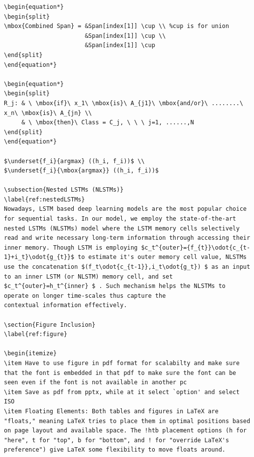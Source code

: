 \documentclass{article}
\begin{document}
\begin{lstlisting}
\begin{equation*}
\begin{split}
\mbox{Combined Span} = &Span[index[1]] \cup \\ %cup is for union
                       &Span[index[1]] \cup \\
                       &Span[index[1]] \cup
\end{split}
\end{equation*}

\begin{equation*}
\begin{split}
R_j: & \ \mbox{if}\ x_1\ \mbox{is}\ A_{j1}\ \mbox{and/or}\ ........\ x_n\ \mbox{is}\ A_{jn} \\
     & \ \mbox{then}\ Class = C_j, \ \ \ j=1, ......,N     
\end{split}
\end{equation*}

$\underset{f_i}{argmax} ((h_i, f_i))$ \\
$\underset{f_i}{\mbox{argmax}} ((h_i, f_i))$

\subsection{Nested LSTMs (NLSTMs)}
\label{ref:nestedLSTMs}
Nowadays, LSTM based deep learning models are the most popular choice for sequential tasks. In our model, we employ the state-of-the-art nested LSTMs (NLSTMs) model where the LSTM memory cells selectively read and write necessary long-term information through accessing their inner memory. Though LSTM is employing $c_t^{outer}={f_{t}}\odot{c_{t-1}+i_t}\odot{g_{t}}$ to estimate it's outer memory cell value, NLSTMs use the concatenation $(f_t\odot{c_{t-1}},i_t\odot{g_t}) $ as an input to an inner LSTM (or NLSTM) memory cell, and set $c_t^{outer}=h_t^{inner} $ . Such mechanism helps the NLSTMs to operate on longer time-scales thus capture the
contextual information effectively.

\section{Figure Inclusion}
\label{ref:figure}

\begin{itemize}
\item Have to use figure in pdf format for scalabilty and make sure that the font is embedded in that pdf to make sure the font can be seen even if the font is not available in another pc
\item Save as pdf from pptx, while at it select `option' and select ISO
\item Floating Elements: Both tables and figures in LaTeX are "floats," meaning LaTeX tries to place them in optimal positions based on page layout and available space. The !htb placement options (h for "here", t for "top", b for "bottom", and ! for "override LaTeX's preference") give LaTeX some flexibility to move floats around.


\end{lstlisting}
\end{document}
